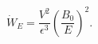 \begin{equation} \label{Espeed}
\dot W_E = \frac{V^2}{\epsilon^3}\left(\frac{B_0}{E}\right)^2.
\end{equation}


